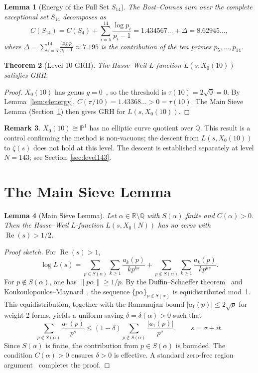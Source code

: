 \documentclass[11pt,letterpaper]{article}
\newtheorem{theorem}{Theorem}[section]
\newtheorem{lemma}[theorem]{Lemma}
\theoremstyle{definition}
\newtheorem{remark}[theorem]{Remark}
\begin{document}
\begin{lemma}[Energy of the Full Set $S_{14}$]
The Bost--Connes sum over the complete exceptional set $S_{14}$ decomposes as
\[
  C(S_{14}) = C(S_4) + \sum_{i=5}^{14} \frac{\log p_i}{p_i - 1}
            = 1.434567\ldots + \Delta = 8.62945\ldots,
\]
where $\Delta = \sum_{i=5}^{14} \frac{\log p_i}{p_i - 1} \approx 7.195$ is the
contribution of the ten primes $p_5,\ldots,p_{14}$.
\end{lemma}

\begin{theorem}[Level 10 GRH]\label{thm:level10}
The Hasse--Weil $L$-function $L(s, X_0(10))$ satisfies GRH\@.
\end{theorem}
\begin{proof}
$X_0(10)$ has genus $g = 0$~\cite{LMFDB}, so the threshold is
$\tau(10) = 2\sqrt{0} = 0$.
By Lemma~\ref{lem:s4energy}, $C(\pi/10) = 1.43368\ldots > 0 = \tau(10)$.
The Main Sieve Lemma (Section~\ref{sec:sieve}) then gives GRH for $L(s, X_0(10))$.
\end{proof}

\begin{remark}
$X_0(10) \cong \mathbb{P}^1$ has no elliptic curve quotient over $\mathbb{Q}$.
This result is a control confirming the method is non-vacuous; the descent from
$L(s, X_0(10))$ to $\zeta(s)$ does not hold at this level.  The descent is
established separately at level $N = 143$; see Section~\ref{sec:level143}.
\end{remark}

\section{The Main Sieve Lemma}\label{sec:sieve}

\begin{lemma}[Main Sieve Lemma]
Let $\alpha \in \mathbb{R} \setminus \mathbb{Q}$ with $S(\alpha)$ finite and
$C(\alpha) > 0$.
Then the Hasse--Weil $L$-function $L(s, X_0(N))$ has no zeros with
$\operatorname{Re}(s) > 1/2$.
\end{lemma}
\begin{proof}[Proof sketch]
For $\operatorname{Re}(s) > 1$,
\[
  \log L(s) = \sum_{p \in S(\alpha)}\sum_{k \geq 1} \frac{a_k(p)}{kp^{ks}}
             + \sum_{p \notin S(\alpha)}\sum_{k \geq 1} \frac{a_k(p)}{kp^{ks}}.
\]
For $p \notin S(\alpha)$, one has $\|p\alpha\| \geq 1/p$.
By the Duffin--Schaeffer theorem~\cite{DS41} and Koukoulopoulos--Maynard~\cite{KM20},
the sequence $\{p\alpha\}_{p \notin S(\alpha)}$ is equidistributed mod~1.
This equidistribution, together with the Ramanujan bound $|a_1(p)| \leq 2\sqrt{p}$
for weight-2 forms, yields a uniform saving $\delta = \delta(\alpha) > 0$ such that
\[
  \sum_{p \notin S(\alpha)} \frac{a_1(p)}{p^s}
  \leq (1-\delta) \sum_{p \notin S(\alpha)} \frac{|a_1(p)|}{p^\sigma},
  \qquad s = \sigma + it.
\]
Since $S(\alpha)$ is finite, the contribution from $p \in S(\alpha)$ is bounded.
The condition $C(\alpha) > 0$ ensures $\delta > 0$ is effective.
A standard zero-free region argument~\cite{Titchmarsh86} completes the proof.
\end{proof}
\end{document}
